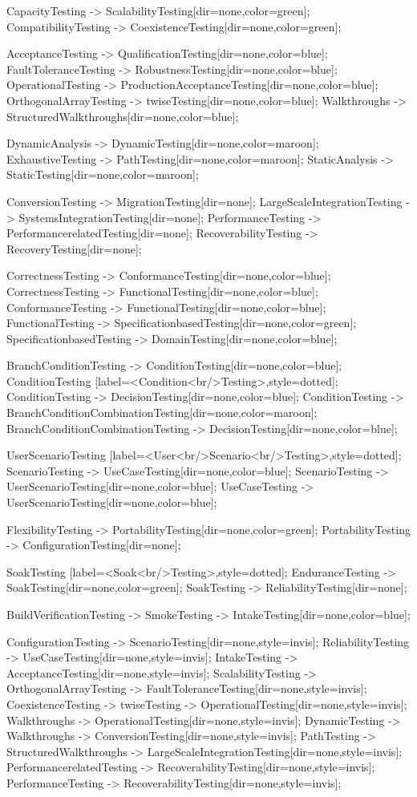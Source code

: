 \documentclass{article}
\begin{document}
{CapacityTesting -> ScalabilityTesting[dir=none,color=green];
CompatibilityTesting -> CoexistenceTesting[dir=none,color=green];

AcceptanceTesting -> QualificationTesting[dir=none,color=blue];
FaultToleranceTesting -> RobustnessTesting[dir=none,color=blue];
OperationalTesting -> ProductionAcceptanceTesting[dir=none,color=blue];
OrthogonalArrayTesting -> twiseTesting[dir=none,color=blue];
Walkthroughs -> StructuredWalkthroughs[dir=none,color=blue];

DynamicAnalysis -> DynamicTesting[dir=none,color=maroon];
ExhaustiveTesting -> PathTesting[dir=none,color=maroon];
StaticAnalysis -> StaticTesting[dir=none,color=maroon];

ConversionTesting -> MigrationTesting[dir=none];
LargeScaleIntegrationTesting -> SystemsIntegrationTesting[dir=none];
PerformanceTesting -> PerformancerelatedTesting[dir=none];
RecoverabilityTesting -> RecoveryTesting[dir=none];

CorrectnessTesting -> ConformanceTesting[dir=none,color=blue];
CorrectnessTesting -> FunctionalTesting[dir=none,color=blue];
ConformanceTesting -> FunctionalTesting[dir=none,color=blue];
FunctionalTesting -> SpecificationbasedTesting[dir=none,color=green];
SpecificationbasedTesting -> DomainTesting[dir=none,color=blue];

BranchConditionTesting -> ConditionTesting[dir=none,color=blue];
ConditionTesting [label=<Condition<br/>Testing>,style=dotted];
ConditionTesting -> DecisionTesting[dir=none,color=blue];
ConditionTesting -> BranchConditionCombinationTesting[dir=none,color=maroon];
BranchConditionCombinationTesting -> DecisionTesting[dir=none,color=blue];

UserScenarioTesting [label=<User<br/>Scenario<br/>Testing>,style=dotted];
ScenarioTesting -> UseCaseTesting[dir=none,color=blue];
ScenarioTesting -> UserScenarioTesting[dir=none,color=blue];
UseCaseTesting -> UserScenarioTesting[dir=none,color=blue];

FlexibilityTesting -> PortabilityTesting[dir=none,color=green];
PortabilityTesting -> ConfigurationTesting[dir=none];

SoakTesting [label=<Soak<br/>Testing>,style=dotted];
EnduranceTesting -> SoakTesting[dir=none,color=green];
SoakTesting -> ReliabilityTesting[dir=none];

BuildVerificationTesting -> SmokeTesting -> IntakeTesting[dir=none,color=blue];

ConfigurationTesting -> ScenarioTesting[dir=none,style=invis];
ReliabilityTesting -> UseCaseTesting[dir=none,style=invis];
IntakeTesting -> AcceptanceTesting[dir=none,style=invis];
ScalabilityTesting -> OrthogonalArrayTesting -> FaultToleranceTesting[dir=none,style=invis];
CoexistenceTesting -> twiseTesting -> OperationalTesting[dir=none,style=invis];
Walkthroughs -> OperationalTesting[dir=none,style=invis];
DynamicTesting -> Walkthroughs -> ConversionTesting[dir=none,style=invis];
PathTesting -> StructuredWalkthroughs -> LargeScaleIntegrationTesting[dir=none,style=invis];
PerformancerelatedTesting -> RecoverabilityTesting[dir=none,style=invis];
PerformanceTesting -> RecoverabilityTesting[dir=none,style=invis];

}
\end{document}
